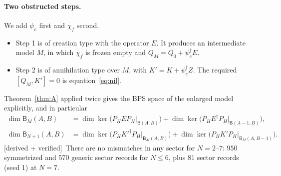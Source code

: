 \documentclass[11pt]{article}
\newcommand{\B}{\mathsf B}
\newcommand{\PH}{P_{\!H}}
\newcommand{\psie}{\psi_e}
\newcommand{\chif}{\chi_f}
\newcommand{\tagbox}[2]{\textsf{\small\color{#1}[#2]}}
\newcommand{\VER}{\tagbox{cder}{derived + verified}}
\theoremstyle{plain}
\theoremstyle{remark}
\numberwithin{equation}{section}
\begin{document}
\paragraph{Two obstructed steps.} We add $\psie$ first and $\chif$ second.
\begin{itemize}\itemsep2pt
\item Step 1 is of creation type with the operator $E$. It produces an intermediate model $M$, in which $\chif$ is
  frozen empty and $Q_M=Q_0+\psie^\dagger E$.
\item Step 2 is of annihilation type over $M$, with $K'=K+\psie^\dagger Z$. The required $[Q_M,K']=0$ is
  equation~\eqref{eq:nil}.
\end{itemize}
Theorem~\ref{thm:A} applied twice gives the BPS space of the enlarged model explicitly, and in particular
\begin{align}
\dim\B_M(A,B)&=\dim\ker\big(\PH E\PH\big|_{\B(A,B)}\big)+\dim\ker\big(\PH E^\dagger\PH\big|_{\B(A-1,B)}\big),\label{eq:dimM}\\
\dim\B_{N+1}(A,B)&=\dim\ker\big(\PH K'^\dagger\PH\big|_{\B_M(A,B)}\big)+\dim\ker\big(\PH K'\PH\big|_{\B_M(A,B-1)}\big).\label{eq:dimN}
\end{align}
\VER\ There are no mismatches in any sector for $N=2$--$7$: $950$ symmetrized and $570$ generic sector records for
$N\le6$, plus 81 sector records (seed 1) at $N=7$.
\end{document}
